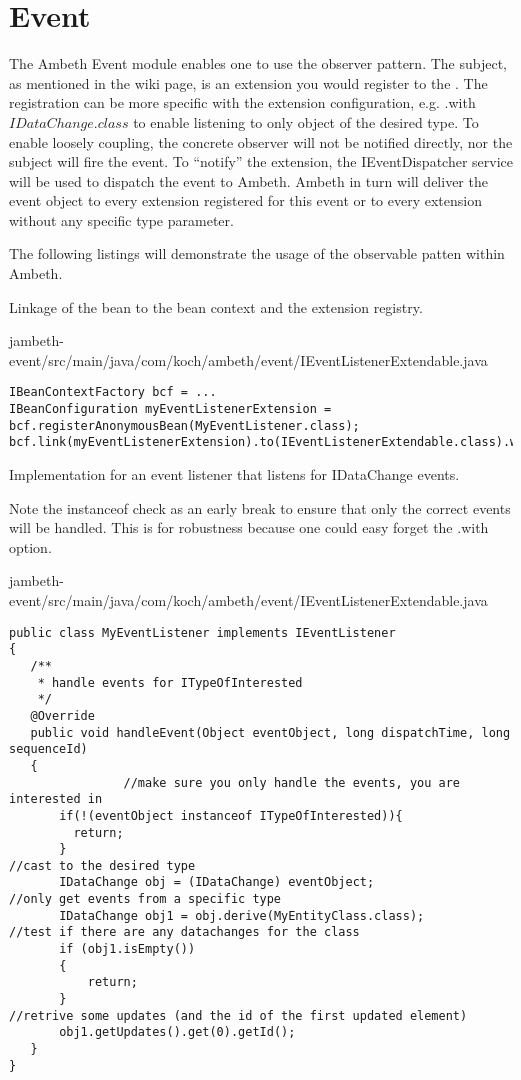 \section{Event}
\label{module:Event}
\ClearAPI
\TODO
The Ambeth Event module enables one to use the observer pattern\cite{obs15}. 
The subject, as mentioned in the wiki page, is an extension you would register to the . The registration can be more specific with the extension configuration, e.g. .with\(IDataChange.class\) to enable listening to only object of the desired type.
To enable loosely coupling, the concrete observer will not be notified directly, nor the subject will fire the event. To ``notify'' the extension, the IEventDispatcher service will be used to dispatch the event to Ambeth. Ambeth in turn will deliver the event object to every extension registered for this event or to every extension without any specific type parameter.

The following listings will demonstrate the usage of the observable patten within Ambeth.

Linkage of the bean to the bean context and the extension registry.

{jambeth-event/src/main/java/com/koch/ambeth/event/IEventListenerExtendable.java}
\begin{lstlisting}[style=Java,caption={Example registration of an EventListener}]
IBeanContextFactory bcf = ...
IBeanConfiguration myEventListenerExtension = bcf.registerAnonymousBean(MyEventListener.class);
bcf.link(myEventListenerExtension).to(IEventListenerExtendable.class).with(IDataChange.class);
\end{lstlisting}

Implementation for an event listener that listens for IDataChange events.

Note the instanceof check as an early break to ensure that only the correct events will be handled. This is for robustness because one could easy forget the .with\(\) option.

{jambeth-event/src/main/java/com/koch/ambeth/event/IEventListenerExtendable.java}
\begin{lstlisting}[style=Java,caption={}]
public class MyEventListener implements IEventListener
{
   /**
    * handle events for ITypeOfInterested
    */
   @Override
   public void handleEvent(Object eventObject, long dispatchTime, long sequenceId)
   {
				//make sure you only handle the events, you are interested in
       if(!(eventObject instanceof ITypeOfInterested)){
         return;
       }
//cast to the desired type
       IDataChange obj = (IDataChange) eventObject;
//only get events from a specific type
       IDataChange obj1 = obj.derive(MyEntityClass.class);
//test if there are any datachanges for the class
       if (obj1.isEmpty())
       {
           return;
       }
//retrive some updates (and the id of the first updated element)
       obj1.getUpdates().get(0).getId();
   }
}
\end{lstlisting}

